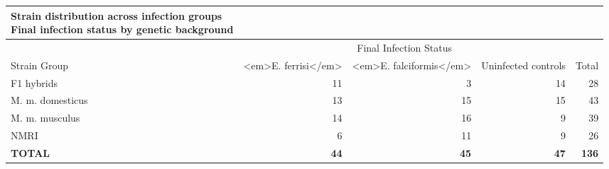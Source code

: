\begin{longtable}{lrrrr}
\caption*{
{\large Strain distribution across infection groups} \\ 
{\small Final infection status by genetic background}
} \\ 
\toprule
 & \multicolumn{3}{c}{Final Infection Status} &  \\ 
\cmidrule(lr){2-4}
Strain Group & <em>E. ferrisi</em> & <em>E. falciformis</em> & Uninfected controls & Total \\ 
\midrule\addlinespace[2.5pt]
F1 hybrids & 11 & 3 & 14 & 28 \\ 
M. m. domesticus & 13 & 15 & 15 & 43 \\ 
M. m. musculus & 14 & 16 & 9 & 39 \\ 
NMRI & 6 & 11 & 9 & 26 \\ 
\textbf{TOTAL} & \textbf{44} & \textbf{45} & \textbf{47} & \textbf{136} \\ 
\bottomrule
\end{longtable}

